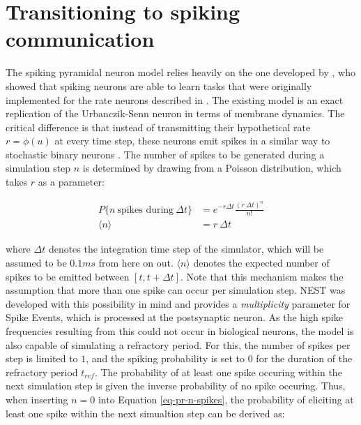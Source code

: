 \section{Transitioning to spiking communication}

The spiking pyramidal neuron model relies heavily on the one developed by \cite{Stapmanns2021}, who showed that spiking
neurons are able to learn tasks that were originally implemented for the rate neurons described in
\cite{urbanczik2014learning}. The existing model is an exact replication of the Urbanczik-Senn neuron in terms of
membrane dynamics. The critical difference is that instead of transmitting their hypothetical rate $r = \phi(u)$ at
every time step, these neurons emit spikes in a similar way to stochastic binary neurons \citep{Ginzburg1994}. The
number of spikes to be generated during a simulation step $n$ is determined by drawing from a Poisson distribution,
which takes $r$ as a parameter:

\begin{align}
  P\{\textit{n} \ \text{spikes during} \ \Delta t\} & = e^{-r \Delta t} \frac{(r \ \Delta t) ^ n}{n!}\label{eq-pr-n-spikes} \\
  \langle \textit{n} \rangle                        & = r \ \Delta t \label{eq-n-spikes}
\end{align}


where $\Delta t$ denotes the integration time step of the simulator, which will be assumed to be $0.1 ms$ from here on
out.  $\langle \textit{n} \rangle$ denotes the expected number of spikes to be emitted between $[t, t+ \Delta t]$.
Note that this mechanism makes the assumption that more than one spike can occur per simulation step. NEST was developed
with this possibility in mind and provides a \textit{multiplicity} parameter for Spike Events, which is processed at the
postsynaptic neuron. As the high spike frequencies resulting from this could not occur in biological neurons, the model
is also capable of simulating a refractory period. For this, the number of spikes per step is limited to $1$, and the
spiking probability is set to 0 for the duration of the refractory period $t_{ref}$. The probability of at least one
spike occuring within the next simulation step is given the inverse probability of no spike occuring. Thus, when
inserting $n=0$ into Equation \ref{eq-pr-n-spikes}, the probability of eliciting at least one spike within the next
simualtion step can be derived as:

